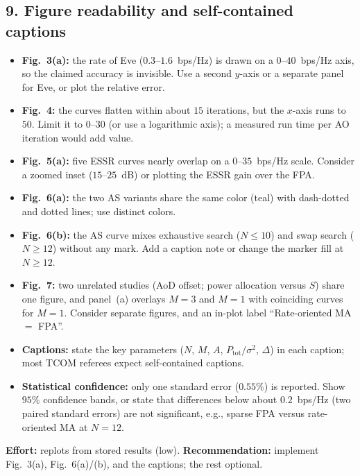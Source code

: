 \documentclass[10.5pt,a4paper]{article}
\newcommand{\Moderate}{\textcolor{BurntOrange}{\textbf{Moderate}}}
\newcommand{\comment}[3]{\subsection*{#1}\vspace{-4pt}{\small Severity: #2\qquad Category: #3}\par}
\begin{document}
\comment{9. Figure readability and self-contained captions}{\Moderate}{Figures}
\begin{itemize}
\item \textbf{Fig.~3(a):} the rate of Eve ($0.3$--$1.6$~bps/Hz) is drawn on a $0$--$40$~bps/Hz axis, so the claimed accuracy is invisible. Use a second $y$-axis or a separate panel for Eve, or plot the relative error.
\item \textbf{Fig.~4:} the curves flatten within about $15$ iterations, but the $x$-axis runs to $50$. Limit it to $0$--$30$ (or use a logarithmic axis); a measured run time per AO iteration would add value.
\item \textbf{Fig.~5(a):} five ESSR curves nearly overlap on a $0$--$35$~bps/Hz scale. Consider a zoomed inset ($15$--$25$~dB) or plotting the ESSR gain over the FPA.
\item \textbf{Fig.~6(a):} the two AS variants share the same color (teal) with dash-dotted and dotted lines; use distinct colors.
\item \textbf{Fig.~6(b):} the AS curve mixes exhaustive search ($N\le10$) and swap search ($N\ge12$) without any mark. Add a caption note or change the marker fill at $N\ge12$.
\item \textbf{Fig.~7:} two unrelated studies (AoD offset; power allocation versus $S$) share one figure, and panel~(a) overlays $M=3$ and $M=1$ with coinciding curves for $M=1$. Consider separate figures, and an in-plot label ``Rate-oriented MA $=$ FPA''.
\item \textbf{Captions:} state the key parameters ($N$, $M$, $A$, $P_{\mathrm{tot}}/\sigma^2$, $\Delta$) in each caption; most TCOM referees expect self-contained captions.
\item \textbf{Statistical confidence:} only one standard error ($0.55\%$) is reported. Show $95\%$ confidence bands, or state that differences below about $0.2$~bps/Hz (two paired standard errors) are not significant, e.g., sparse FPA versus rate-oriented MA at $N=12$.
\end{itemize}
\textbf{Effort:} replots from stored results (low). \textbf{Recommendation:} implement Fig.~3(a), Fig.~6(a)/(b), and the captions; the rest optional.
\end{document}
